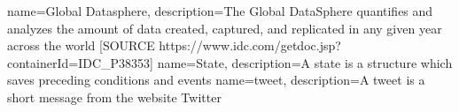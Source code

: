  {
   name=Global Datasphere,
   description={The Global DataSphere quantifies and analyzes the amount of data created, captured, and replicated in any given year across the world [SOURCE https://www.idc.com/getdoc.jsp?containerId=IDC_P38353]}
}
 {
   name=State,
   description={A state is a structure which saves preceding conditions and events}
}
 {
   name=tweet,
   description={A tweet is a short message from the website Twitter}
}

